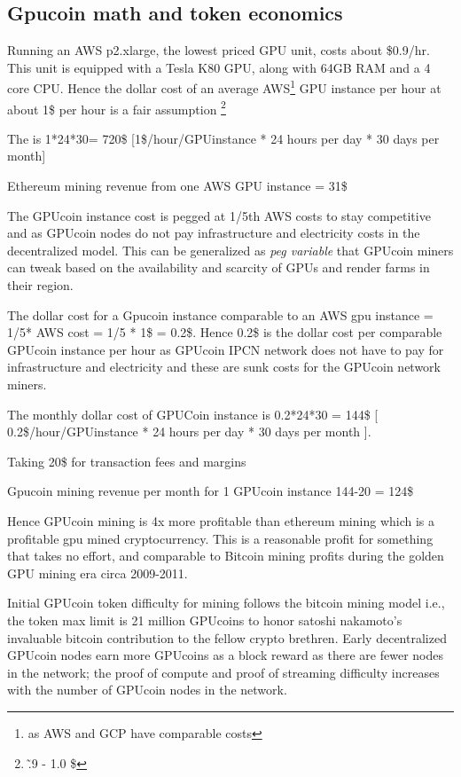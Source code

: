 \subsection{Gpucoin math and token economics}
Running an AWS p2.xlarge, the lowest priced GPU unit, costs about \$0.9/hr. This unit is equipped with a Tesla K80 GPU, along with 64GB RAM and a 4 core CPU. 
Hence the dollar cost of an average AWS\footnote{as AWS and GCP have comparable costs} GPU instance per hour at about 1\$ per hour is a fair assumption \footnote{\~.9 - 1.0 \$ }

The  is 1*24*30=  720\$ 
[1\$/hour/GPUinstance * 24 hours per day * 30 days per month]

Ethereum mining revenue from one AWS GPU instance = 31\$

The GPUcoin instance cost is pegged at 1/5th AWS costs to stay competitive and as GPUcoin nodes do not pay infrastructure and electricity costs in the decentralized model. This can be generalized as \emph{peg variable} that GPUcoin miners can tweak based on the availability and scarcity of GPUs and render farms in their region.

The dollar cost for a Gpucoin instance comparable to an AWS gpu instance = 1/5* AWS cost = 1/5 * 1\$ = 0.2\$. Hence 0.2\$ is the dollar cost per comparable GPUcoin instance per hour as GPUcoin IPCN network does not have to pay for infrastructure and electricity and these are sunk costs for the GPUcoin network miners.


The monthly dollar cost of GPUCoin instance is 0.2*24*30 = 144\$ 
[ 0.2\$/hour/GPUinstance * 24 hours per day * 30 days per month ].


Taking 20\$ for transaction fees and margins

Gpucoin mining revenue per month for 1 GPUcoin instance
144-20 = 124\$

Hence GPUcoin mining is 4x more profitable than ethereum mining which is a profitable gpu mined cryptocurrency. This is a reasonable profit for something that takes no effort, and comparable to Bitcoin mining profits during the golden GPU mining era circa 2009-2011.

Initial GPUcoin token difficulty for mining follows the bitcoin mining model i.e., the token max limit is 21 million GPUcoins to honor satoshi nakamoto’s invaluable bitcoin contribution to the fellow crypto brethren. Early decentralized GPUcoin nodes earn more GPUcoins as a block reward as there are fewer nodes in the network; the proof of compute and proof of streaming difficulty increases with the number of GPUcoin nodes in the network.

